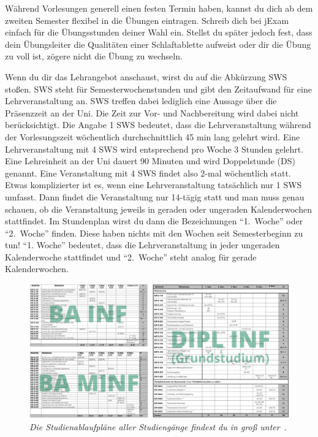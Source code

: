 \pagebreak

Während Vorlesungen generell einen festen Termin haben, kannst du dich ab dem zweiten Semester flexibel in die Übungen eintragen.
Schreib dich bei jExam~ einfach für die Übungsstunden deiner Wahl ein.
Stellst du später jedoch fest, dass dein Übungsleiter die Qualitäten einer Schlaftablette aufweist oder dir die Übung zu voll ist, zögere nicht die Übung zu wechseln.

Wenn du dir das Lehrangebot anschaust, wirst du auf die Abkürzung SWS stoßen. SWS steht für Semesterwochenstunden und gibt den Zeitaufwand für eine Lehrveranstaltung an.
SWS treffen dabei lediglich eine Aussage über die Präsenzzeit an der Uni. Die Zeit zur Vor- und Nachbereitung wird dabei nicht berücksichtigt.
Die Angabe 1 SWS bedeutet, dass die Lehrveranstaltung während der Vorlesungszeit wöchentlich durchschnittlich 45 min lang gelehrt wird. Eine Lehrveranstaltung mit 4 SWS wird entsprechend
pro Woche 3 Stunden gelehrt. Eine Lehreinheit an der Uni dauert 90 Minuten und wird Doppelstunde (DS) genannt. Eine Veranstaltung mit 4 SWS findet also 2-mal wöchentlich statt.
Etwas komplizierter ist es, wenn eine Lehrveranstaltung tatsächlich nur 1 SWS umfasst. Dann findet die Veranstaltung nur 14-tägig statt und man muss genau schauen, ob die Veranstaltung jeweils in
geraden oder ungeraden Kalenderwochen stattfindet. Im Stundenplan wirst du dann die Bezeichnungen \enquote{1.\ Woche} oder \enquote{2.\ Woche} finden. Diese haben nichts mit den Wochen seit Semesterbeginn zu tun!
\enquote{1. Woche} bedeutet, dass die Lehrveranstaltung in jeder ungeraden Kalenderwoche stattfindet und \enquote{2.\ Woche} steht analog für gerade Kalenderwochen.

\begin{figure}
	\includegraphics[width=\textwidth]{img/alle_studienablaufplaene.png}
	\caption*{\small \textit{Die Studienablaufpläne aller Studiengänge findest du in groß unter}~.}
\end{figure}

